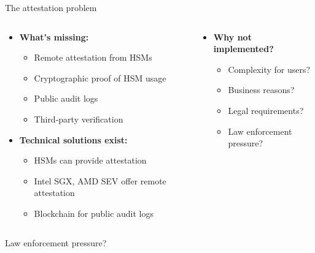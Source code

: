 \documentclass[aspectratio=169, lualatex, handout]{beamer}
\begin{document}
\begin{frame}{The attestation problem}
	\begin{columns}[c]
		\begin{column}{0.5\textwidth}
			\begin{itemize}
				\item \textbf{What's missing:}
				      \begin{itemize}
					      \item Remote attestation from HSMs
					      \item Cryptographic proof of HSM usage
					      \item Public audit logs
					      \item Third-party verification
				      \end{itemize}
				\item \textbf{Technical solutions exist:}
				      \begin{itemize}
					      \item HSMs can provide attestation
					      \item Intel SGX, AMD SEV offer remote attestation
					      \item Blockchain for public audit logs
				      \end{itemize}
			\end{itemize}
		\end{column}
		\begin{column}{0.5\textwidth}
			\begin{itemize}
				\item \textbf{Why not implemented?}
				      \begin{itemize}
					      \item Complexity for users?
					      \item Business reasons?
					      \item Legal requirements?
					      \item Law enforcement pressure?
				      \end{itemize}
			\end{itemize}
		\end{column}
	\end{columns}
\end{frame}

\begin{frame}{Law enforcement pressure?}
	\begin{columns}[c]
		\begin{column}{0.5\textwidth}
		\end{column}
		\begin{column}{0.5\textwidth}
		\end{column}
	\end{columns}
\end{frame}
\end{document}
